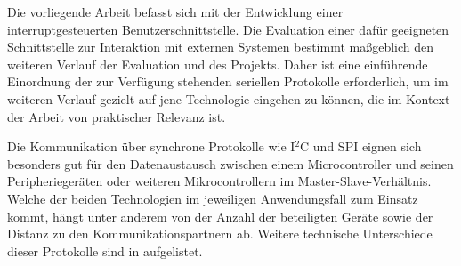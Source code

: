 Die vorliegende Arbeit befasst sich mit der Entwicklung einer interruptgesteuerten Benutzerschnittstelle. Die Evaluation einer daf\"ur geeigneten Schnittstelle zur Interaktion mit externen  Systemen bestimmt ma{\ss}geblich den weiteren Verlauf der Evaluation und des Projekts. Daher ist eine einf\"uhrende Einordnung der zur Verf\"ugung stehenden seriellen Protokolle erforderlich, um im weiteren Verlauf gezielt auf jene Technologie eingehen zu k\"onnen, die im Kontext der Arbeit von praktischer Relevanz ist.

Die Kommunikation \"uber synchrone Protokolle wie I$^{2}$C und SPI eignen sich besonders gut f\"ur den Datenaustausch zwischen einem Microcontroller und seinen Peripherieger\"aten oder weiteren Mikrocontrollern im Master-Slave-Verh\"altnis. Welche der beiden Technologien im jeweiligen Anwendungsfall zum Einsatz kommt, h\"angt unter anderem von der Anzahl der beteiligten Ger\"ate sowie der Distanz zu den Kommunikationspartnern ab. Weitere technische Unterschiede dieser Protokolle sind in  aufgelistet.

